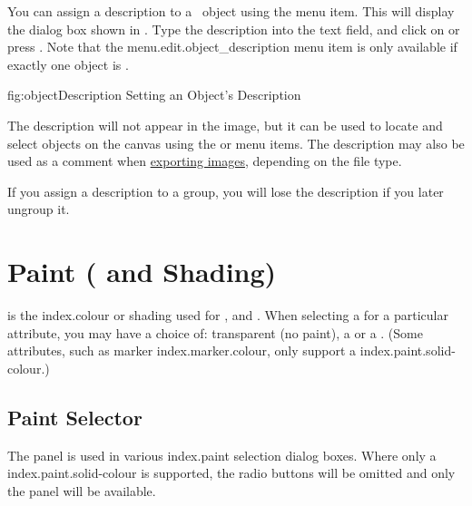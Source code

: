 You can assign a description to a \selected\ \gls*{object} using the
 menu item. This will display the
dialog box shown in . Type the
description into the text field, and click on  or press
.  Note that the \gls{menu.edit.object_description}
menu item is only available if exactly one object is \selected.

\FloatFig
  {fig:objectDescription}
  {}
  {Setting an Object's Description}

The description will not appear in the image, but it can be used to
locate and select \glspl*{object} on the canvas using the
 or
 menu items. The description
may also be used as a comment when
\hyperref[sec:exportimage]{exporting images}, depending on the
file type.

\begin{important}
If you assign a description to a \gls{group},
you will lose the description if you later ungroup it.
\end{important}

\chapter{Paint ( and Shading)}
\label{sec:paintcolourandshading}

 is the \gls{index.colour} or \gls{shading} used for
,  and . When selecting a
 for a particular attribute, you may have a choice of:
transparent (no paint), a  or a .
(Some attributes, such as marker \gls{index.marker.colour},
only support a \gls{index.paint.solid-colour}.)

\section{Paint Selector}\label{sec:paint}


The  panel is used in various \gls{index.paint}
selection dialog boxes. Where only a \gls{index.paint.solid-colour} 
is supported, the radio buttons will be omitted and only the 
 panel will be available.



